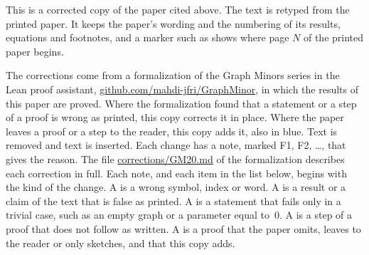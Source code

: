 
This is a corrected copy of the paper cited above. The text is retyped from the printed paper.
It keeps the paper's wording and the numbering of its results, equations and footnotes, and a
marker such as  shows where page $N$ of the printed paper begins.

The corrections come from a formalization of the Graph Minors series in the Lean proof
assistant, \href{https://github.com/mahdi-jfri/GraphMinor}{github.com/mahdi-jfri/GraphMinor},
in which the results of this paper are proved. Where the formalization found that a statement
or a step of a proof is wrong as printed, this copy corrects it in place. Where the paper leaves a proof or a step to the reader, this
copy adds it, also in blue. Text  is removed and text  is inserted. Each change has a note, marked
\textcolor{fixcolor}{\sffamily F1}, \textcolor{fixcolor}{\sffamily F2}, \dots, that gives the
reason. The file
\href{https://github.com/mahdi-jfri/GraphMinor/blob/main/corrections/GM20.md}{corrections/GM20.md}
of the formalization describes each correction in full. Each note, and each item in the list below, begins with the kind of the change. A  is a wrong symbol, index or word. A  is a result or a claim of the text that is false as printed. A  is a statement that fails only in a trivial case, such as an empty graph or a parameter equal to~$0$. A  is a step of a proof that does not follow as written. A  is a proof that the paper omits, leaves to the reader or only sketches, and that this copy adds.

